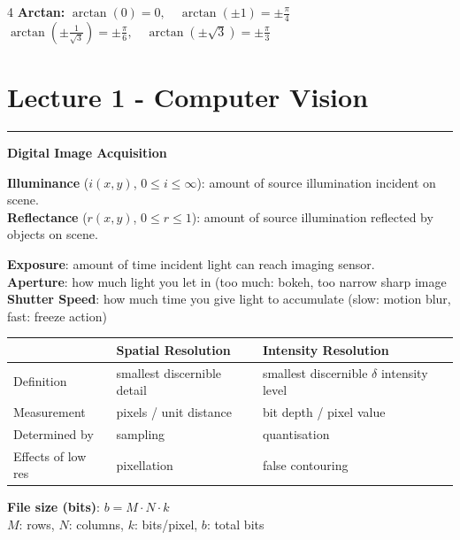 \documentclass[10pt]{extarticle}
\newcommand{\sectionrule}{\vspace{-2pt}\hrule\vspace{2pt}}
\begin{document}
\begin{multicols}{4}
\noindent\textbf{Arctan: } $\arctan(0)=0,\quad \arctan(\pm1)=\pm\frac{\pi}{4}$\\[-2pt]
$\arctan(\pm\frac{1}{\sqrt{3}})=\pm\frac{\pi}{6},\quad \arctan(\pm\sqrt{3})=\pm\frac{\pi}{3}$

\section*{Lecture 1 - Computer Vision}
\sectionrule


\textbf{Digital Image Acquisition}

\vspace{0.5em}

\textbf{Illuminance} ($i(x,y)$, $0 \leq i \leq \infty$): amount of source illumination incident on scene.\\
\textbf{Reflectance} ($r(x,y)$, $0 \leq r \leq 1$): amount of source illumination reflected by objects on scene.

\textbf{Exposure}: amount of time incident light can reach imaging sensor. \\
\textbf{Aperture}: how much light you let in (too much: bokeh, too narrow sharp image\\
\textbf{Shutter Speed}: how much time you give light to accumulate (slow: motion blur, fast: freeze action)

\vspace{-0.8em}

\begin{center}
    \small
    {\tiny
    \begin{tabular}{|p{1.5cm}|p{2cm}|p{2cm}|}
        \hline
        & \textbf{Spatial Resolution} & \textbf{Intensity Resolution} \\
        \hline
        Definition & smallest discernible detail & smallest discernible $\delta$ intensity level \\
        \hline
        Measurement & pixels / unit distance & bit depth / pixel value \\
        \hline
        Determined by & sampling & quantisation \\
        \hline
        Effects of low res & pixellation & false contouring \\
        \hline
    \end{tabular}
    }
    \label{tab:spatial-intensity}
\end{center}
\vspace{-1.5em}

\textbf{File size (bits)}: $b = M \cdot N \cdot k$ \\
\footnotesize
$M$: rows, $N$: columns, $k$: bits/pixel, $b$: total bits


\end{multicols}
\end{document}
